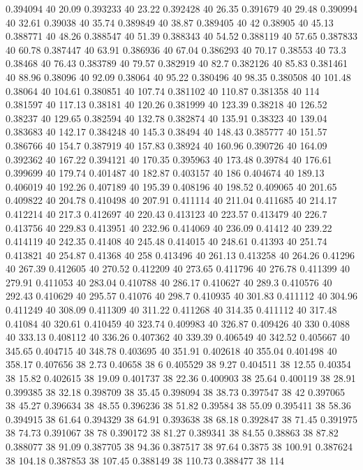 0.394094 40 20.09
0.393233 40 23.22
0.392428 40 26.35
0.391679 40 29.48
0.390994 40 32.61
0.39038 40 35.74
0.389849 40 38.87
0.389405 40 42
0.38905 40 45.13
0.388771 40 48.26
0.388547 40 51.39
0.388343 40 54.52
0.388119 40 57.65
0.387833 40 60.78
0.387447 40 63.91
0.386936 40 67.04
0.386293 40 70.17
0.38553 40 73.3
0.38468 40 76.43
0.383789 40 79.57
0.382919 40 82.7
0.382126 40 85.83
0.381461 40 88.96
0.38096 40 92.09
0.38064 40 95.22
0.380496 40 98.35
0.380508 40 101.48
0.38064 40 104.61
0.380851 40 107.74
0.381102 40 110.87
0.381358 40 114
0.381597 40 117.13
0.38181 40 120.26
0.381999 40 123.39
0.38218 40 126.52
0.38237 40 129.65
0.382594 40 132.78
0.382874 40 135.91
0.38323 40 139.04
0.383683 40 142.17
0.384248 40 145.3
0.38494 40 148.43
0.385777 40 151.57
0.386766 40 154.7
0.387919 40 157.83
0.38924 40 160.96
0.390726 40 164.09
0.392362 40 167.22
0.394121 40 170.35
0.395963 40 173.48
0.39784 40 176.61
0.399699 40 179.74
0.401487 40 182.87
0.403157 40 186
0.404674 40 189.13
0.406019 40 192.26
0.407189 40 195.39
0.408196 40 198.52
0.409065 40 201.65
0.409822 40 204.78
0.410498 40 207.91
0.411114 40 211.04
0.411685 40 214.17
0.412214 40 217.3
0.412697 40 220.43
0.413123 40 223.57
0.413479 40 226.7
0.413756 40 229.83
0.413951 40 232.96
0.414069 40 236.09
0.41412 40 239.22
0.414119 40 242.35
0.41408 40 245.48
0.414015 40 248.61
0.41393 40 251.74
0.413821 40 254.87
0.41368 40 258
0.413496 40 261.13
0.413258 40 264.26
0.41296 40 267.39
0.412605 40 270.52
0.412209 40 273.65
0.411796 40 276.78
0.411399 40 279.91
0.411053 40 283.04
0.410788 40 286.17
0.410627 40 289.3
0.410576 40 292.43
0.410629 40 295.57
0.41076 40 298.7
0.410935 40 301.83
0.411112 40 304.96
0.411249 40 308.09
0.411309 40 311.22
0.411268 40 314.35
0.411112 40 317.48
0.41084 40 320.61
0.410459 40 323.74
0.409983 40 326.87
0.409426 40 330
0.4088 40 333.13
0.408112 40 336.26
0.407362 40 339.39
0.406549 40 342.52
0.405667 40 345.65
0.404715 40 348.78
0.403695 40 351.91
0.402618 40 355.04
0.401498 40 358.17
0.407656 38 2.73
0.40658 38 6
0.405529 38 9.27
0.404511 38 12.55
0.40354 38 15.82
0.402615 38 19.09
0.401737 38 22.36
0.400903 38 25.64
0.400119 38 28.91
0.399385 38 32.18
0.398709 38 35.45
0.398094 38 38.73
0.397547 38 42
0.397065 38 45.27
0.396634 38 48.55
0.396236 38 51.82
0.39584 38 55.09
0.395411 38 58.36
0.394915 38 61.64
0.394329 38 64.91
0.393638 38 68.18
0.392847 38 71.45
0.391975 38 74.73
0.391067 38 78
0.390172 38 81.27
0.389341 38 84.55
0.38863 38 87.82
0.388077 38 91.09
0.387705 38 94.36
0.387517 38 97.64
0.3875 38 100.91
0.387624 38 104.18
0.387853 38 107.45
0.388149 38 110.73
0.388477 38 114
